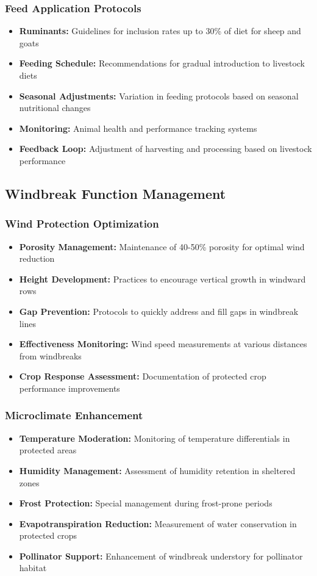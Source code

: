 \subsubsection{Feed Application Protocols}
\begin{itemize}
    \item \textbf{Ruminants:} Guidelines for inclusion rates up to 30\% of diet for sheep and goats
    \item \textbf{Feeding Schedule:} Recommendations for gradual introduction to livestock diets
    \item \textbf{Seasonal Adjustments:} Variation in feeding protocols based on seasonal nutritional changes
    \item \textbf{Monitoring:} Animal health and performance tracking systems
    \item \textbf{Feedback Loop:} Adjustment of harvesting and processing based on livestock performance
\end{itemize}

\subsection{Windbreak Function Management}

\subsubsection{Wind Protection Optimization}
\begin{itemize}
    \item \textbf{Porosity Management:} Maintenance of 40-50\% porosity for optimal wind reduction
    \item \textbf{Height Development:} Practices to encourage vertical growth in windward rows
    \item \textbf{Gap Prevention:} Protocols to quickly address and fill gaps in windbreak lines
    \item \textbf{Effectiveness Monitoring:} Wind speed measurements at various distances from windbreaks
    \item \textbf{Crop Response Assessment:} Documentation of protected crop performance improvements
\end{itemize}

\subsubsection{Microclimate Enhancement}
\begin{itemize}
    \item \textbf{Temperature Moderation:} Monitoring of temperature differentials in protected areas
    \item \textbf{Humidity Management:} Assessment of humidity retention in sheltered zones
    \item \textbf{Frost Protection:} Special management during frost-prone periods
    \item \textbf{Evapotranspiration Reduction:} Measurement of water conservation in protected crops
    \item \textbf{Pollinator Support:} Enhancement of windbreak understory for pollinator habitat
\end{itemize}


